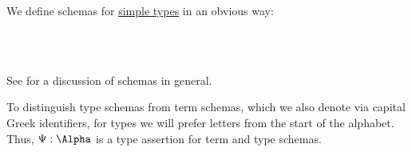 \begin{definition}\label{def:simple_type_schema}
  We define schemas for \hyperref[def:simple_type]{simple types} in an obvious way:
  \begin{bnf*}
        {} \\
       {\bnftsq{(} \bnfsp {} \bnfsp \bnftsq{\( \synimplies \)} \bnfsp {} \bnfsp \bnftsq{)}} \\
             { \bnfor {} \bnfor {}}
  \end{bnf*}
\end{definition}
\begin{comments}
  \item See  for a discussion of schemas in general.
  \item To distinguish type schemas from term schemas, which we also denote via capital Greek identifiers, for types we will prefer letters from the start of the alphabet. Thus, \( \Psi: \Alpha \) is a type assertion for term and type schemas.
\end{comments}

